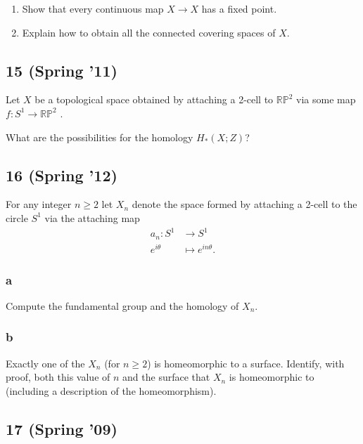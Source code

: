 \begin{enumerate}
\def\labelenumi{\alph{enumi}.}
\item
  Show that every continuous map \(X \to X\) has a fixed point.
\item
  Explain how to obtain all the connected covering spaces of \(X\).
\end{enumerate}

\hypertarget{spring-11-2}{%
\subsection{15 (Spring '11)}\label{spring-11-2}}

Let \(X\) be a topological space obtained by attaching a 2-cell to
\({\mathbb{RP}}^2\) via some map \(f: S^1 \to {\mathbb{RP}}^2\) .

What are the possibilities for the homology \(H_* (X; Z)\)?

\hypertarget{spring-12-1}{%
\subsection{16 (Spring '12)}\label{spring-12-1}}

For any integer \(n \geq 2\) let \(X_n\) denote the space formed by
attaching a 2-cell to the circle \(S^1\) via the attaching map
\begin{align*}  
a_n: S^1 &\to S^1 \\
e^{i\theta} &\mapsto e^{in\theta}
.\end{align*}

\hypertarget{a-1}{%
\subsubsection{a}\label{a-1}}

Compute the fundamental group and the homology of \(X_n\).

\hypertarget{b-1}{%
\subsubsection{b}\label{b-1}}

Exactly one of the \(X_n\) (for \(n \geq 2\)) is homeomorphic to a
surface. Identify, with proof, both this value of \(n\) and the surface
that \(X_n\) is homeomorphic to (including a description of the
homeomorphism).

\hypertarget{spring-09-3}{%
\subsection{17 (Spring '09)}\label{spring-09-3}}

